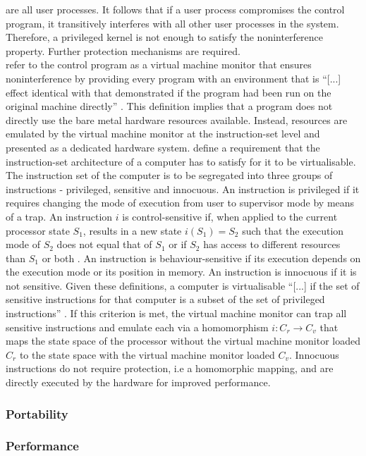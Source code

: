 are all user processes. It follows that if a user process compromises the control 
program, it transitively interferes with all other user processes in the system. 
Therefore, a privileged kernel is not enough to satisfy the noninterference property.
Further protection mechanisms are required.\\
\textcite{10.1145/361011.361073} refer to the control program as a virtual machine monitor that 
ensures noninterference by providing every program with an environment that is \enquote{[...] effect
identical with that demonstrated if the program had been run on the original machine directly} 
\cite[2]{10.1145/361011.361073}. 
This definition implies that a program does not directly use the bare metal hardware resources 
available. Instead, resources are emulated by the virtual machine monitor at the instruction-set level 
and presented as a dedicated hardware system. 
\textcite{10.1145/361011.361073} define a requirement that the instruction-set architecture 
of a computer has to satisfy for it to be virtualisable. 
The instruction set of the computer is to be segregated into three groups of instructions - privileged, sensitive 
and innocuous. An instruction is privileged if it requires changing the mode of execution from user 
to supervisor mode by means of a trap.
An instruction $i$ is control-sensitive if, when applied to the current processor state $S_1$, 
results in a new state $i(S_{1}) = S_{2}$ such that the execution mode of $S_{2}$ does not equal 
that of $S_{1}$ or if $S_{2}$ has access to different resources than $S_1$ or both 
\cite{10.1145/361011.361073}. An instruction is behaviour-sensitive if its execution depends on the 
execution mode or its position in memory. An instruction is innocuous if it is not sensitive. 
Given these definitions, a computer is virtualisable \enquote{[...] if the set of sensitive instructions
for that computer is a subset of the set of privileged instructions} \cite[6]{10.1145/361011.361073}.
If this criterion is met, the virtual machine monitor can trap all sensitive instructions and 
emulate each via a homomorphism $i: C_{r} \rightarrow C_{v}$ that maps the state space of the 
processor without the virtual machine monitor loaded $C_{r}$ to the state space with the 
virtual machine monitor loaded $C_{v}$. 
Innocuous instructions do not require protection, i.e a homomorphic mapping, and are 
directly executed by the hardware for improved performance. 

\subsubsection{Portability}
\subsubsection{Performance}